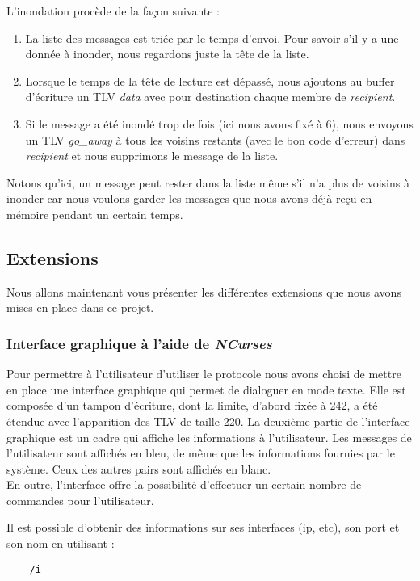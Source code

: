 \documentclass{FR16}
\begin{document}
L'inondation procède de la façon suivante :
\begin{enumerate}
    \item La liste des messages est triée par le temps d'envoi. Pour savoir s'il y a une donnée à inonder, nous regardons juste la tête de la liste.\\
    \item Lorsque le temps de la tête de lecture est dépassé, nous ajoutons au buffer d'écriture un TLV \textit{data} avec pour destination chaque membre de \textit{recipient}.\\
    \item Si le message a été inondé trop de fois (ici nous avons fixé à 6), nous envoyons un TLV \textit{go\_away} à tous les voisins restants (avec le bon code d'erreur) dans \textit{recipient} et nous supprimons le message de la liste.
\end{enumerate}
Notons qu'ici, un message peut rester dans la liste même s'il n'a plus de voisins à inonder car nous voulons garder les messages que nous avons déjà reçu en mémoire pendant un certain temps.

\subsection{Extensions}
Nous allons maintenant vous présenter les différentes extensions que nous avons mises en place dans ce projet.

\subsubsection{Interface graphique à l'aide de \textit{NCurses}}
Pour permettre à l'utilisateur d'utiliser le protocole nous avons choisi de mettre en place une interface graphique qui permet de dialoguer en mode texte. Elle est composée d'un tampon d'écriture, dont la limite, d'abord fixée à 242, a été étendue avec l'apparition des TLV de taille 220. La deuxième partie de l'interface graphique est un cadre qui affiche les informations à l'utilisateur. Les messages de l'utilisateur sont affichés en bleu, de même que les informations fournies par le système. Ceux des autres pairs sont affichés en blanc. \\
En outre, l'interface offre la possibilité d'effectuer un certain nombre de commandes pour l'utilisateur.

Il est possible d'obtenir des informations sur ses interfaces (ip, etc), son port et son nom en utilisant :
\begin{verbatim}
    /i 
\end{verbatim}
\end{document}
